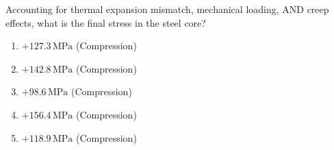 \documentclass[12pt,a4paper]{article}
\begin{document}
\begin{questionbox}
\begin{center}
\end{center}

Accounting for thermal expansion mismatch, mechanical loading, AND creep effects, 
what is the final stress in the steel core?

\begin{mcqbox}
\begin{enumerate}[label=(\Alph*),leftmargin=*]
    \item $+127.3\,\text{MPa}$ (Compression)
    \item $+142.8\,\text{MPa}$ (Compression)
    \item $+98.6\,\text{MPa}$ (Compression)
    \item $+156.4\,\text{MPa}$ (Compression)
    \item $+118.9\,\text{MPa}$ (Compression)
\end{enumerate}
\end{mcqbox}
\end{questionbox}
\end{document}

